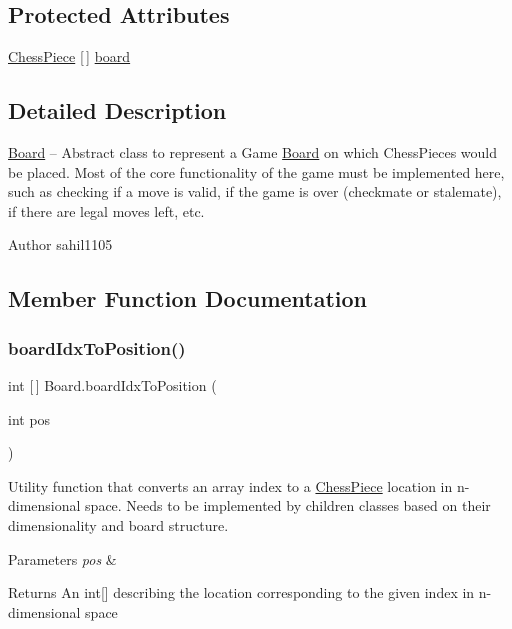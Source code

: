 \subsection*{Protected Attributes}
\begin{DoxyCompactItemize}
\item 
\mbox{\hyperlink{class_chess_piece}{Chess\+Piece}} \mbox{[}$\,$\mbox{]} \mbox{\hyperlink{class_board_a50512629d3c28bc8e1bd6278e1955d91}{board}}
\end{DoxyCompactItemize}


\subsection{Detailed Description}
\mbox{\hyperlink{class_board}{Board}} -- Abstract class to represent a Game \mbox{\hyperlink{class_board}{Board}} on which Chess\+Pieces would be placed. Most of the core functionality of the game must be implemented here, such as checking if a move is valid, if the game is over (checkmate or stalemate), if there are legal moves left, etc. \begin{DoxyAuthor}{Author}
sahil1105 
\end{DoxyAuthor}


\subsection{Member Function Documentation}
\mbox{\label{class_board_a55a61aea44ab1a05806e5195ad5645b5}} 
\subsubsection{\texorpdfstring{board\+Idx\+To\+Position()}{boardIdxToPosition()}}
{\footnotesize\ttfamily int \mbox{[}$\,$\mbox{]} Board.\+board\+Idx\+To\+Position (\begin{DoxyParamCaption}\item[{int}]{pos }\end{DoxyParamCaption})\hspace{0.3cm}{\ttfamily [protected]}}

Utility function that converts an array index to a \mbox{\hyperlink{class_chess_piece}{Chess\+Piece}} location in n-\/dimensional space. Needs to be implemented by children classes based on their dimensionality and board structure. 
\begin{DoxyParams}{Parameters}
{\em pos} & \\
\hline
\end{DoxyParams}
\begin{DoxyReturn}{Returns}
An int\mbox{[}\mbox{]} describing the location corresponding to the given index in n-\/dimensional space 
\end{DoxyReturn}
\mbox{\label{class_board_a2d576d78510ea4ebc9ec4036d782cd59}} 
